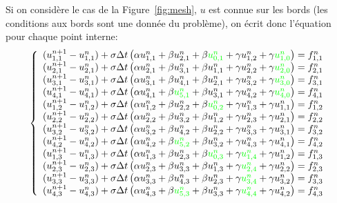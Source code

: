 \documentclass[11pt]{article}
\begin{document}
Si on considère le cas de la Figure~\ref{fig:mesh}, $u$ est connue sur les bords (les conditions aux bords sont une donnée du problème), on écrit donc l'équation pour chaque point interne:
\begin{equation}
\left\{
\begin{array}{l}
(u^{n+1}_{1,1}-u^{n}_{1,1}) + \sigma\Delta t\left(\alpha u^{n}_{1,1} + \beta u^{n}_{2,1} +  \beta {\color{green}u^{n}_{0,1}} +  \gamma u^{n}_{1,2} +  \gamma {\color{green}u^{n}_{1,0}}\right) = f^{n}_{1,1} \\ 
(u^{n+1}_{2,1}-u^{n}_{2,1}) + \sigma\Delta t\left(\alpha u^{n}_{2,1} + \beta u^{n}_{3,1} +  \beta u^{n}_{1,1} +  \gamma u^{n}_{2,2} +  \gamma {\color{green}u^{n}_{2,0}}\right) = f^{n}_{2,1} \\ 
(u^{n+1}_{3,1}-u^{n}_{3,1}) + \sigma\Delta t\left(\alpha u^{n}_{3,1} + \beta u^{n}_{4,1} +  \beta u^{n}_{2,1} +  \gamma u^{n}_{3,2} +  \gamma {\color{green}u^{n}_{3,0}}\right) = f^{n}_{3,1} \\ 
(u^{n+1}_{4,1}-u^{n}_{4,1}) + \sigma\Delta t\left(\alpha u^{n}_{4,1} + \beta {\color{green}u^{n}_{5,1}} +  \beta u^{n}_{3,1} +  \gamma u^{n}_{4,2} +  \gamma {\color{green}u^{n}_{4,0}}\right) = f^{n}_{4,1} \\ 
(u^{n+1}_{1,2}-u^{n}_{1,2}) + \sigma\Delta t\left(\alpha u^{n}_{1,2} + \beta u^{n}_{2,2} +  \beta {\color{green}u^{n}_{0,2}} +  \gamma u^{n}_{1,3} +  \gamma u^{n}_{1,1}\right) = f^{n}_{1,2} \\ 
(u^{n+1}_{2,2}-u^{n}_{2,2}) + \sigma\Delta t\left(\alpha u^{n}_{2,2} + \beta u^{n}_{3,2} +  \beta u^{n}_{1,2} +  \gamma u^{n}_{2,3} +  \gamma u^{n}_{2,1}\right) = f^{n}_{2,2} \\ 
(u^{n+1}_{3,2}-u^{n}_{3,2}) + \sigma\Delta t\left(\alpha u^{n}_{3,2} + \beta u^{n}_{4,2} +  \beta u^{n}_{2,2} +  \gamma u^{n}_{3,3} +  \gamma u^{n}_{3,1}\right) = f^{n}_{3,2} \\ 
(u^{n+1}_{4,2}-u^{n}_{4,2}) + \sigma\Delta t\left(\alpha u^{n}_{4,2} + \beta {\color{green}u^{n}_{5,2}} +  \beta u^{n}_{3,2} +  \gamma u^{n}_{4,3} +  \gamma u^{n}_{4,1}\right) = f^{n}_{4,2} \\ 
(u^{n+1}_{1,3}-u^{n}_{1,3}) + \sigma\Delta t\left(\alpha u^{n}_{1,3} + \beta u^{n}_{2,3} +  \beta {\color{green}u^{n}_{0,3}} +  \gamma {\color{green}u^{n}_{1,4}} +  \gamma u^{n}_{1,2}\right) = f^{n}_{1,3} \\ 
(u^{n+1}_{2,3}-u^{n}_{2,3}) + \sigma\Delta t\left(\alpha u^{n}_{2,3} + \beta u^{n}_{3,3} +  \beta u^{n}_{1,3} +  \gamma {\color{green}u^{n}_{2,4}} +  \gamma u^{n}_{2,2}\right) = f^{n}_{2,3} \\ 
(u^{n+1}_{3,3}-u^{n}_{3,3}) + \sigma\Delta t\left(\alpha u^{n}_{3,3} + \beta u^{n}_{4,3} +  \beta u^{n}_{2,3} +  \gamma {\color{green}u^{n}_{3,4}} +  \gamma u^{n}_{3,2}\right) = f^{n}_{3,3} \\ 
(u^{n+1}_{4,3}-u^{n}_{4,3}) + \sigma\Delta t\left(\alpha u^{n}_{4,3} + \beta {\color{green}u^{n}_{5,3}} +  \beta u^{n}_{3,3} +  \gamma {\color{green}u^{n}_{4,4}} +  \gamma u^{n}_{4,2}\right) = f^{n}_{4,3} \\ 
\end{array}
\right.
\end{equation}
\end{document}
